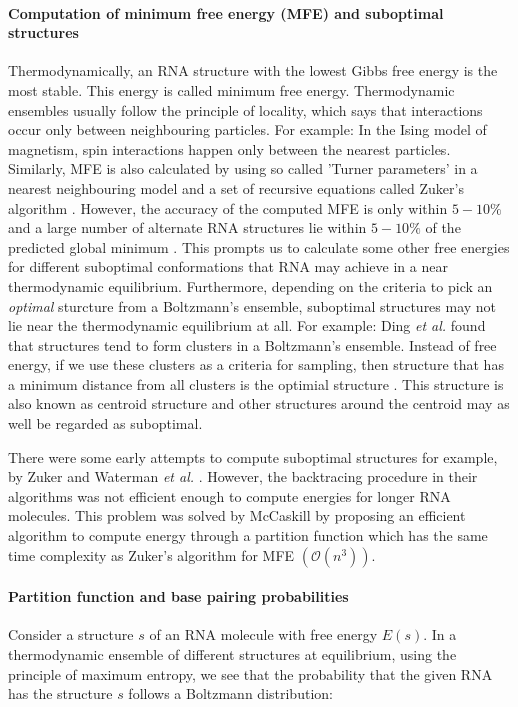 \paragraph{Computation of minimum free energy (MFE) and suboptimal structures}
Thermodynamically, an RNA structure with the lowest Gibbs free energy is the most stable. This energy is called minimum free energy. Thermodynamic ensembles usually follow the principle of locality, which says that interactions occur only between neighbouring particles. For example: In the Ising model of magnetism, spin interactions happen only between the nearest particles. Similarly, MFE is also calculated by using so called 'Turner parameters' \cite{turner2009nndb} in a nearest neighbouring model and a set of recursive equations called Zuker's algorithm \cite{zuker1981optimal}. However, the accuracy of the computed MFE is only within $5-10\%$ and a large number of alternate RNA structures lie within $5-10\%$ of the predicted global minimum \cite{eddy2004rna}. This prompts us to calculate some other free energies for different suboptimal conformations that RNA may achieve in a near thermodynamic equilibrium. Furthermore, depending on the criteria to pick an \textit{optimal} sturcture from a Boltzmann's ensemble, suboptimal structures may not lie near the thermodynamic equilibrium at all. For example: Ding \textit{et al.} \cite{ding2005rna}  found that structures tend to form clusters in a Boltzmann's ensemble. Instead of free energy, if we use these clusters as a criteria for sampling, then structure that has a minimum distance from all clusters is the optimial structure \cite{lorenz2016predicting}. This structure is also known as centroid structure and other structures around the centroid may as well be regarded as suboptimal.



There were some early attempts to compute suboptimal structures for example, by Zuker \cite{zuker1989finding} and Waterman \textit{et al.} \cite{waterman1985dynamic}. However, the backtracing procedure in their algorithms was not efficient enough to compute energies for longer RNA molecules. This problem was solved by McCaskill \cite{mccaskill1990equilibrium} by proposing an efficient algorithm to compute energy through a partition function which has the same time complexity as Zuker's algorithm for MFE $(\mathcal{O}(n^{3}))$.

\paragraph{Partition function and base pairing probabilities}
Consider a structure $s$ of an RNA molecule with free energy $E(s)$. In a thermodynamic ensemble of different structures at equilibrium, using the principle of maximum entropy, we see that the probability that the given RNA has the structure $s$ follows a Boltzmann distribution:

